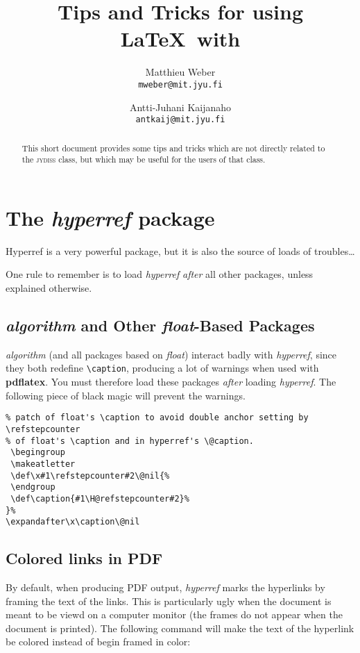 \documentclass[a4paper,12pt]{article}
\author{Matthieu Weber\\ \texttt{mweber@mit.jyu.fi} \and Antti-Juhani Kaijanaho\\ \texttt{antkaij@mit.jyu.fi}}
\title{Tips and Tricks for using \LaTeX\ with \cls{JYdiss}}
\newcommand{\cmd}[1]{\texttt{\textbackslash#1}}
\newcommand{\pack}[1]{\textit{#1}}
\newcommand{\cls}[1]{\textsc{#1}}
\newcommand{\prog}[1]{\textbf{\textsf{#1}}}
\begin{document}
\maketitle


\begin{abstract}
This short document provides some tips and tricks which are not directly
related to the \cls{jydiss} class, but which may be useful for the users of
that class.
\end{abstract}

\tableofcontents

\section{The \pack{hyperref} package}

Hyperref is a very powerful package, but it is also the source of loads of
troubles\dots

One rule to remember is to load \pack{hyperref} \emph{after} all other
packages, unless explained otherwise.

\subsection{\pack{algorithm} and Other \pack{float}-Based Packages}

\pack{algorithm} (and all packages based on \pack{float}) interact badly with
\pack{hyperref}, since they both redefine \cmd{caption}, producing a lot of
warnings when used with \prog{pdflatex}. You must therefore load these packages
\emph{after} loading \pack{hyperref}. The following piece of black magic will
prevent the warnings.

\begin{verbatim}
% patch of float's \caption to avoid double anchor setting by \refstepcounter
% of float's \caption and in hyperref's \@caption. 
 \begingroup
 \makeatletter
 \def\x#1\refstepcounter#2\@nil{%
 \endgroup
 \def\caption{#1\H@refstepcounter#2}%  
}%
\expandafter\x\caption\@nil
\end{verbatim}

\subsection{Colored links in PDF}

By default, when producing PDF output, \pack{hyperref} marks the hyperlinks by
framing the text of the links. This is particularly ugly when the document is
meant to be viewd on a computer monitor (the frames do not appear when the
document is printed). The following command will make the text of the
hyperlink be colored instead of begin framed in color:
\end{document}
